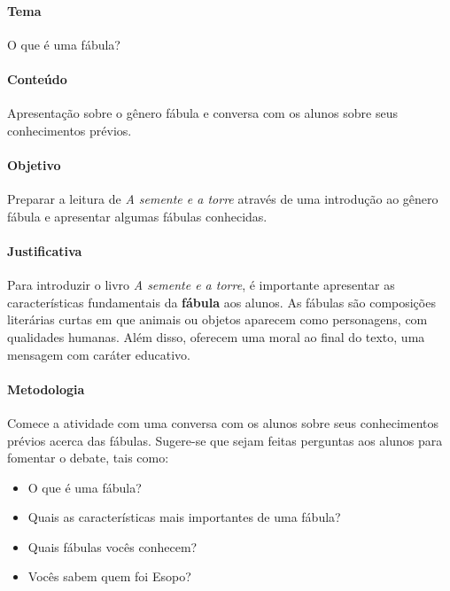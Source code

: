 \documentclass[11pt]{extarticle}
\begin{document}

\paragraph{Tema} O que é uma fábula?

\paragraph{Conteúdo} Apresentação sobre o gênero fábula e conversa com os alunos sobre seus conhecimentos prévios.

\paragraph{Objetivo} Preparar a leitura de \textit{A semente e a torre} através de uma introdução ao gênero fábula e apresentar algumas fábulas conhecidas.

\paragraph{Justificativa} Para introduzir o livro \textit{A semente e a torre}, é importante apresentar as características fundamentais da \textbf{fábula} aos alunos. As fábulas são composições literárias curtas em que animais ou objetos aparecem como personagens, com qualidades humanas. Além disso, oferecem uma moral ao final do texto, uma mensagem com caráter educativo.


\paragraph{Metodologia} Comece a atividade com uma conversa com os alunos sobre seus conhecimentos prévios acerca das fábulas. Sugere-se que sejam feitas perguntas aos alunos para fomentar o debate, tais como:

\begin{itemize}

\item O que é uma fábula?

\item Quais as características mais importantes de uma fábula?

\item Quais fábulas vocês conhecem?

\item Vocês sabem quem foi Esopo?

\end{itemize}
\end{document}
